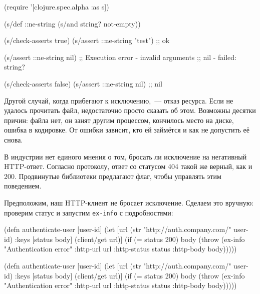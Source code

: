 \else

\begin{english}
  \begin{clojure}
(require '[clojure.spec.alpha :as s])

(s/def ::ne-string (s/and string? not-empty))

(s/check-asserts true)
(s/assert ::ne-string "test") ;; ok

(s/assert ::ne-string nil)
;; Execution error - invalid arguments
;; nil - failed: string?

(s/check-asserts false)
(s/assert ::ne-string nil) ;; nil
  \end{clojure}
\end{english}

\fi

Другой случай, когда прибегают к исключению,~--- отказ ресурса. Если не удалось
прочитать файл, недостаточно просто сказать об этом. Возможны десятки причин:
файла нет, он занят другим процессом, кончилось место на диске, ошибка в
кодировке. От ошибки зависит, кто ей займётся и как не допустить её
снова.


В индустрии нет единого мнения о том, бросать ли исключение на негативный
HTTP-ответ. Согласно протоколу, ответ со статусом 404 такой же верный, как и
200. Продвинутые библиотеки предлагают флаг, чтобы управлять этим поведением.

Предположим, наш HTTP-клиент не бросает исключение. Сделаем это вручную:
проверим статус и запустим \verb|ex-info| с подробностями:


\ifx\DEVICETYPE\MOBILE

\begin{english}
  \begin{clojure}
(defn authenticate-user [user-id]
  (let [url (str
              "http://auth.company.com/"
              user-id)
        {:keys [status body]}
        (client/get url)]
    (if (= status 200)
      body
      (throw (ex-info
               "Authentication error"
               {:http-url url
                :http-status status
                :http-body body})))))
  \end{clojure}
\end{english}

\else

\begin{english}
  \begin{clojure}
(defn authenticate-user [user-id]
  (let [url (str "http://auth.company.com/" user-id)
        {:keys [status body]} (client/get url)]
    (if (= status 200)
      body
      (throw (ex-info "Authentication error"
                      {:http-url url
                       :http-status status
                       :http-body body})))))
  \end{clojure}
\end{english}

